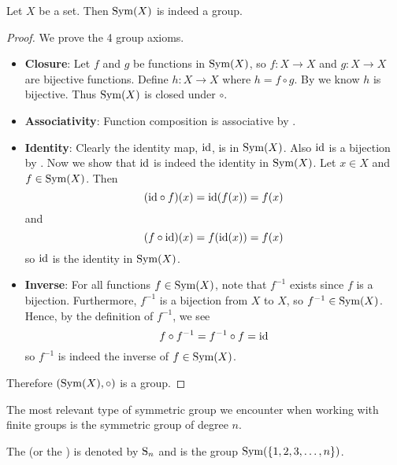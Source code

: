 \begin{proposition}
    Let $X$ be a set. Then $\mathrm{Sym}(X)$ is indeed a group.
\end{proposition}
\begin{proof}
    We prove the 4 group axioms.
    \begin{itemize}
        \item \textbf{Closure}: Let $f$ and $g$ be functions in $\mathrm{Sym}(X)$, so $f: X\to X$ and $g:X \to X$ are bijective functions. Define $h:X \to X$ where $h = f\circ g$. By  we know $h$ is bijective. Thus $\mathrm{Sym}(X)$ is closed under $\circ$.

        \item \textbf{Associativity}: Function composition is associative by .

        \item \textbf{Identity}: Clearly the identity map, $\mathrm{id}$, is in $\mathrm{Sym}(X)$. Also $\mathrm{id}$ is a bijection by . Now we show that $\mathrm{id}$ is indeed the identity in $\mathrm{Sym}(X)$. Let $x \in X$ and $f \in \mathrm{Sym}(X)$. Then
        \[
            (\mathrm{id} \circ f)(x) = \mathrm{id}(f(x)) = f(x)
        \]
        and
        \[
            (f \circ \mathrm{id})(x) = f(\mathrm{id}(x)) = f(x)
        \]
        so $\mathrm{id}$ is the identity in $\mathrm{Sym}(X)$.

        \item \textbf{Inverse}: For all functions $f \in \mathrm{Sym}(X)$, note that $f^{-1}$ exists since $f$ is a bijection. Furthermore, $f^{-1}$ is a bijection from $X$ to $X$, so $f^{-1} \in \mathrm{Sym}(X)$. Hence, by the definition of $f^{-1}$, we see
        \[
            f \circ f^{-1} = f^{-1} \circ f = \mathrm{id}
        \]
        so $f^{-1}$ is indeed the inverse of $f \in \mathrm{Sym}(X)$.
    \end{itemize}
    Therefore $(\mathrm{Sym}(X), \circ)$ is a group.
\end{proof}

The most relevant type of symmetric group we encounter when working with finite groups is the symmetric group of degree $n$.

\begin{definition}
    The  (or the ) is denoted by $\mathrm{S}_{n}$ and is the group $\mathrm{Sym}(\{1, 2, 3, \dots, n\})$.
\end{definition}

